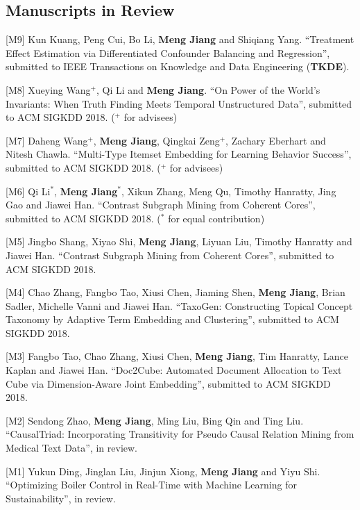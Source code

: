 \documentclass[margin, 9pt]{res}
\begin{document}
\begin{resume}

\section{Manuscripts in Review}

[M9] Kun Kuang, Peng Cui, Bo Li, \textbf{Meng Jiang} and Shiqiang Yang. ``Treatment Effect Estimation via Differentiated Confounder Balancing and Regression'', submitted to IEEE Transactions on Knowledge and Data Engineering (\textbf{TKDE}).

[M8] Xueying Wang${}^{+}$, Qi Li and \textbf{Meng Jiang}. ``On Power of the World’s Invariants: When Truth Finding Meets Temporal Unstructured Data'', submitted to ACM SIGKDD 2018. (${}^{+}$ for advisees)

[M7] Daheng Wang${}^{+}$, \textbf{Meng Jiang}, Qingkai Zeng${}^{+}$, Zachary Eberhart and Nitesh Chawla. ``Multi-Type Itemset Embedding for Learning Behavior Success'', submitted to ACM SIGKDD 2018. (${}^{+}$ for advisees)

[M6] Qi Li${}^{*}$, \textbf{Meng Jiang}${}^{*}$, Xikun Zhang, Meng Qu, Timothy Hanratty, Jing Gao and Jiawei Han. ``Contrast Subgraph Mining from Coherent Cores'', submitted to ACM SIGKDD 2018. (${}^{*}$ for equal contribution)

[M5] Jingbo Shang, Xiyao Shi, \textbf{Meng Jiang}, Liyuan Liu, Timothy Hanratty and Jiawei Han. ``Contrast Subgraph Mining from Coherent Cores'', submitted to ACM SIGKDD 2018.

[M4] Chao Zhang, Fangbo Tao, Xiusi Chen, Jiaming Shen, \textbf{Meng Jiang}, Brian Sadler, Michelle Vanni and Jiawei Han. ``TaxoGen: Constructing Topical Concept Taxonomy by Adaptive Term Embedding and Clustering'', submitted to ACM SIGKDD 2018.

[M3] Fangbo Tao, Chao Zhang, Xiusi Chen, \textbf{Meng Jiang}, Tim Hanratty, Lance Kaplan and Jiawei Han. ``Doc2Cube: Automated Document Allocation to Text Cube via Dimension-Aware Joint Embedding'', submitted to ACM SIGKDD 2018.

[M2] Sendong Zhao, \textbf{Meng Jiang}, Ming Liu, Bing Qin and Ting Liu. ``CausalTriad: Incorporating Transitivity for Pseudo Causal Relation Mining from Medical Text Data'', in review.

[M1] Yukun Ding, Jinglan Liu, Jinjun Xiong, \textbf{Meng Jiang} and Yiyu Shi. ``Optimizing Boiler Control in Real-Time with Machine Learning for Sustainability'', in review.


\end{resume}
\end{document}
